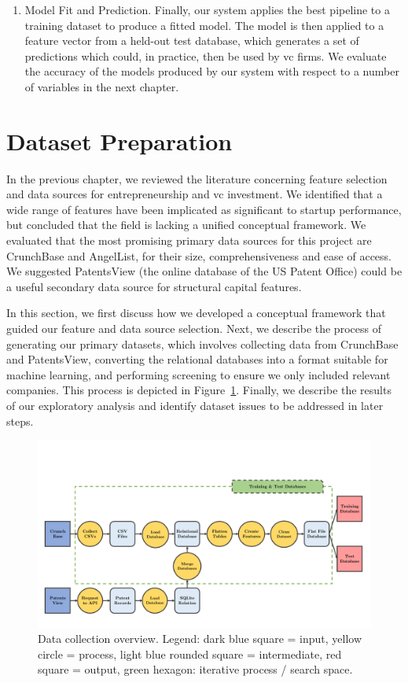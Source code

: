 \documentclass[../thesis/thesis.tex]{subfiles}
\begin{document}
\begin{enumerate}
\item Model Fit and Prediction. Finally, our system applies the best pipeline to a training dataset to produce a fitted model. The model is then applied to a feature vector from a held-out test database, which generates a set of predictions which could, in practice, then be used by \gls{vc} firms. We evaluate the accuracy of the models produced by our system with respect to a number of variables in the next chapter.

\end{enumerate}

\section{Dataset Preparation}

In the previous chapter, we reviewed the literature concerning feature selection and data sources for entrepreneurship and \gls{vc} investment. We identified that a wide range of features have been implicated as significant to startup performance, but concluded that the field is lacking a unified conceptual framework. We evaluated that the most promising primary data sources for this project are CrunchBase and AngelList, for their size, comprehensiveness and ease of access. We suggested PatentsView (the online database of the US Patent Office) could be a useful secondary data source for structural capital features.

In this section, we first discuss how we developed a conceptual framework that guided our feature and data source selection. Next, we describe the process of generating our primary datasets, which involves collecting data from CrunchBase and PatentsView, converting the relational databases into a format suitable for machine learning, and performing screening to ensure we only included relevant companies. This process is depicted in Figure~\ref{fig:design:data_collection}. Finally, we describe the results of our exploratory analysis and identify dataset issues to be addressed in later steps.

\begin{figure}[!htb]
    \centering
    \includegraphics[width=\textwidth]{../figures/design/flowchart_data_collection}
    \caption[Data collection flowchart]{Data collection overview. Legend: dark blue square = input, yellow circle = process, light blue rounded square = intermediate, red square = output, green hexagon: iterative process / search space.}
    \label{fig:design:data_collection}
\end{figure}
\end{document}
